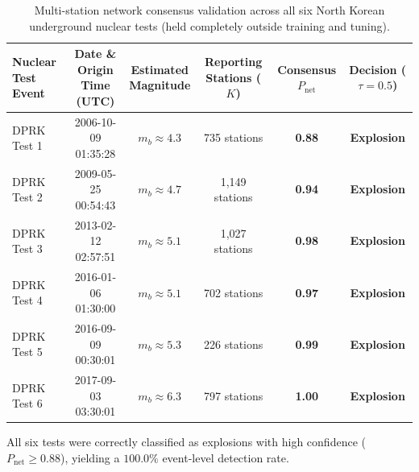 \documentclass[11pt,a4paper]{article}
\begin{document}
\begin{table}[H]
\centering
\small
\renewcommand{\arraystretch}{1.18}
\setlength{\tabcolsep}{6pt}
\begin{tabular}{lccccc}
\toprule
\textbf{Nuclear Test Event} & \shortstack{\textbf{Date \& Origin}\\\textbf{Time (UTC)}} & \shortstack{\textbf{Estimated}\\\textbf{Magnitude}} & \shortstack{\textbf{Reporting}\\\textbf{Stations ($K$)}} & \shortstack{\textbf{Consensus}\\\textbf{$P_{\text{net}}$}} & \shortstack{\textbf{Decision}\\\textbf{($\tau=0.5$)}} \\
\midrule
DPRK Test 1 & 2006-10-09 01:35:28 & $m_b \approx 4.3$ & 735 stations & \textbf{0.88} & \textbf{Explosion} \\
DPRK Test 2 & 2009-05-25 00:54:43 & $m_b \approx 4.7$ & 1,149 stations & \textbf{0.94} & \textbf{Explosion} \\
DPRK Test 3 & 2013-02-12 02:57:51 & $m_b \approx 5.1$ & 1,027 stations & \textbf{0.98} & \textbf{Explosion} \\
DPRK Test 4 & 2016-01-06 01:30:00 & $m_b \approx 5.1$ & 702 stations & \textbf{0.97} & \textbf{Explosion} \\
DPRK Test 5 & 2016-09-09 00:30:01 & $m_b \approx 5.3$ & 226 stations & \textbf{0.99} & \textbf{Explosion} \\
DPRK Test 6 & 2017-09-03 03:30:01 & $m_b \approx 6.3$ & 797 stations & \textbf{1.00} & \textbf{Explosion} \\
\bottomrule
\end{tabular}
\caption{Multi-station network consensus validation across all six North Korean underground nuclear tests (held completely outside training and tuning).}
\label{tab:dprk}
\end{table}

All six tests were correctly classified as explosions with high confidence ($P_{\text{net}} \ge 0.88$), yielding a $100.0\%$ event-level detection rate.
\end{document}

